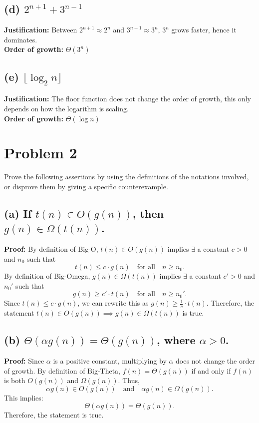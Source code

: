 \documentclass{article}
\begin{document}
\subsection*{(d) \(2^{n+1} + 3^{n-1}\)}
\textbf{Justification:} Between \( 2^{n+1} \approx 2^n \) and \( 3^{n-1} \approx 3^n \), \( 3^n \) grows faster, hence it dominates.
\\ \textbf{Order of growth:} \( \Theta(3^n) \)

\subsection*{(e) \(\lfloor \log_2 n \rfloor\)}
\textbf{Justification:} The floor function does not change the order of growth, this only depends on how the logarithm is scaling.
\\ \textbf{Order of growth:} \( \Theta(\log n) \)

\section*{Problem 2}
Prove the following assertions by using the definitions of the notations involved, or disprove them by giving a specific counterexample.

\subsection*{(a) If \(t(n) \in O(g(n))\), then \(g(n) \in \Omega(t(n))\).}
\textbf{Proof:} 
By definition of Big-O, \( t(n) \in O(g(n)) \) implies \(\exists\) a constant \( c > 0 \) and \( n_0 \) such that 
\[
t(n) \leq c \cdot g(n) \quad \text{for all} \quad n \geq n_0.
\]
By definition of Big-Omega, \( g(n) \in \Omega(t(n)) \) implies \(\exists\) a constant \( c' > 0 \) and \( n_0' \) such that 
\[
g(n) \geq c' \cdot t(n) \quad \text{for all} \quad n \geq n_0'.
\]
Since \( t(n) \leq c \cdot g(n) \), we can rewrite this as \( g(n) \geq \frac{1}{c} \cdot t(n) \). Therefore, the statement \( t(n) \in O(g(n)) \implies g(n) \in \Omega(t(n)) \) is true.

\subsection*{(b) \(\Theta(\alpha g(n)) = \Theta(g(n))\), where \(\alpha > 0\).}
\textbf{Proof:} 
Since \( \alpha \) is a positive constant, multiplying by \(\alpha\) does not change the order of growth. By definition of Big-Theta, \( f(n) = \Theta(g(n)) \) if and only if \( f(n) \) is both \( O(g(n)) \) and \( \Omega(g(n)) \). Thus,
\[
\alpha g(n) \in O(g(n)) \quad \text{and} \quad \alpha g(n) \in \Omega(g(n)).
\]
This implies:
\[
\Theta(\alpha g(n)) = \Theta(g(n)).
\]
Therefore, the statement is true.
\end{document}
